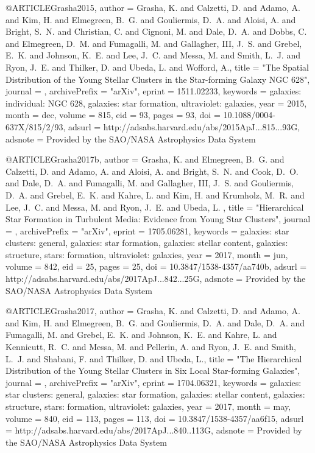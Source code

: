 \documentclass[useAMS,usenatbib]{mnras}
\begin{document}
{{{{{{{{{{{{{{{{@ARTICLE{Grasha2015,
   author = {{Grasha}, K. and {Calzetti}, D. and {Adamo}, A. and {Kim}, H. and 
	{Elmegreen}, B.~G. and {Gouliermis}, D.~A. and {Aloisi}, A. and 
	{Bright}, S.~N. and {Christian}, C. and {Cignoni}, M. and {Dale}, D.~A. and 
	{Dobbs}, C. and {Elmegreen}, D.~M. and {Fumagalli}, M. and {Gallagher}, III, J.~S. and 
	{Grebel}, E.~K. and {Johnson}, K.~E. and {Lee}, J.~C. and {Messa}, M. and 
	{Smith}, L.~J. and {Ryon}, J.~E. and {Thilker}, D. and {Ubeda}, L. and 
	{Wofford}, A.},
    title = "{The Spatial Distribution of the Young Stellar Clusters in the Star-forming Galaxy NGC 628}",
  journal = {\apj},
archivePrefix = "arXiv",
   eprint = {1511.02233},
 keywords = {galaxies: individual: NGC 628, galaxies: star formation, ultraviolet: galaxies},
     year = 2015,
    month = dec,
   volume = 815,
      eid = {93},
    pages = {93},
      doi = {10.1088/0004-637X/815/2/93},
   adsurl = {http://adsabs.harvard.edu/abs/2015ApJ...815...93G},
  adsnote = {Provided by the SAO/NASA Astrophysics Data System}
}

@ARTICLE{Grasha2017b,
   author = {{Grasha}, K. and {Elmegreen}, B.~G. and {Calzetti}, D. and {Adamo}, A. and 
	{Aloisi}, A. and {Bright}, S.~N. and {Cook}, D.~O. and {Dale}, D.~A. and 
	{Fumagalli}, M. and {Gallagher}, III, J.~S. and {Gouliermis}, D.~A. and 
	{Grebel}, E.~K. and {Kahre}, L. and {Kim}, H. and {Krumholz}, M.~R. and 
	{Lee}, J.~C. and {Messa}, M. and {Ryon}, J.~E. and {Ubeda}, L.
	},
    title = "{Hierarchical Star Formation in Turbulent Media: Evidence from Young Star Clusters}",
  journal = {\apj},
archivePrefix = "arXiv",
   eprint = {1705.06281},
 keywords = {galaxies: star clusters: general, galaxies: star formation, galaxies: stellar content, galaxies: structure, stars: formation, ultraviolet: galaxies},
     year = 2017,
    month = jun,
   volume = 842,
      eid = {25},
    pages = {25},
      doi = {10.3847/1538-4357/aa740b},
   adsurl = {http://adsabs.harvard.edu/abs/2017ApJ...842...25G},
  adsnote = {Provided by the SAO/NASA Astrophysics Data System}
}

@ARTICLE{Grasha2017,
   author = {{Grasha}, K. and {Calzetti}, D. and {Adamo}, A. and {Kim}, H. and 
	{Elmegreen}, B.~G. and {Gouliermis}, D.~A. and {Dale}, D.~A. and 
	{Fumagalli}, M. and {Grebel}, E.~K. and {Johnson}, K.~E. and 
	{Kahre}, L. and {Kennicutt}, R.~C. and {Messa}, M. and {Pellerin}, A. and 
	{Ryon}, J.~E. and {Smith}, L.~J. and {Shabani}, F. and {Thilker}, D. and 
	{Ubeda}, L.},
    title = "{The Hierarchical Distribution of the Young Stellar Clusters in Six Local Star-forming Galaxies}",
  journal = {\apj},
archivePrefix = "arXiv",
   eprint = {1704.06321},
 keywords = {galaxies: star clusters: general, galaxies: star formation, galaxies: stellar content, galaxies: structure, stars: formation, ultraviolet: galaxies},
     year = 2017,
    month = may,
   volume = 840,
      eid = {113},
    pages = {113},
      doi = {10.3847/1538-4357/aa6f15},
   adsurl = {http://adsabs.harvard.edu/abs/2017ApJ...840..113G},
  adsnote = {Provided by the SAO/NASA Astrophysics Data System}
}

}}}}}}}}}}}}}}}}
\end{document}
